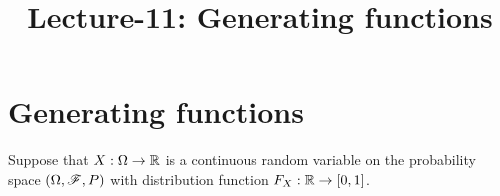 \documentclass[letterpaper,10pt,english]{article}
\title{Lecture-11: Generating functions}
\author{}
\begin{document}
\maketitle

\section{Generating functions}
Suppose that $X:\Omega \to \mathbb{R}$ is a continuous random variable on the probability space $(\Omega,\mathscr{F}, P)$ with distribution function $F_X: \mathbb{R} \to [0,1]$. 

%

\end{document}
